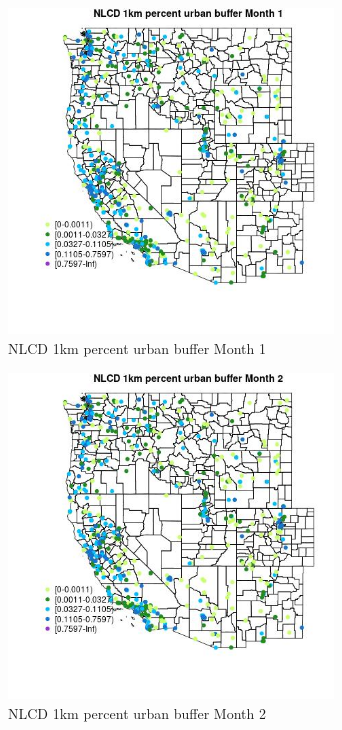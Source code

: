 \begin{figure} 
\centering  
\includegraphics[width=0.77\textwidth]{Code_Outputs/Report_ML_input_PM25_Step4_part_e_de_duplicated_aves_compiled_2019-05-14wNAs_MapObsMo1NLCD_1km_percent_urban_buffer.jpg} 
\caption{\label{fig:Report_ML_input_PM25_Step4_part_e_de_duplicated_aves_compiled_2019-05-14wNAsMapObsMo1NLCD_1km_percent_urban_buffer}NLCD 1km percent urban buffer Month 1} 
\end{figure} 
 

\clearpage 

\begin{figure} 
\centering  
\includegraphics[width=0.77\textwidth]{Code_Outputs/Report_ML_input_PM25_Step4_part_e_de_duplicated_aves_compiled_2019-05-14wNAs_MapObsMo2NLCD_1km_percent_urban_buffer.jpg} 
\caption{\label{fig:Report_ML_input_PM25_Step4_part_e_de_duplicated_aves_compiled_2019-05-14wNAsMapObsMo2NLCD_1km_percent_urban_buffer}NLCD 1km percent urban buffer Month 2} 
\end{figure} 
 

